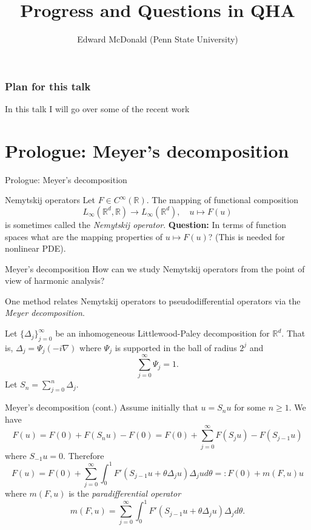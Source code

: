 \documentclass{beamer}
\newcommand\makebeamertitle{\frame{\maketitle}}%
\numberwithin{equation}{section}
\theoremstyle{plain}
\theoremstyle{plain}
\theoremstyle{definition}
\theoremstyle{plain}
\theoremstyle{plain}
\theoremstyle{definition}
\newcommand{\Rl}{\mathbb{R}}
\begin{document}
\title[Some recent progress and unanswered questions in Quantum Harmonic Analysis]{Progress and Questions in QHA}


\author[E. McDonald]{Edward McDonald (Penn State University)}



\makebeamertitle

\begin{frame}\frametitle{Plan for this talk}
    In this talk I will go over some of the recent work
\end{frame}

\section{Prologue: Meyer's decomposition}\label{meyer_section}

\begin{frame}
    \Huge{Prologue: Meyer's decomposition}
\end{frame}


\begin{frame}{Nemytskij operators}
    Let $F\in C^\infty(\Rl).$ The mapping of functional composition
    \[
        L_{\infty}(\Rl^d,\Rl)\to L_{\infty}(\Rl^d),\quad u\mapsto F(u)
    \]
    is sometimes called the \emph{Nemytskij operator}.
\pause
    \textbf{Question:} In terms of function spaces what are the mapping properties of $u\mapsto F(u)$? (This is needed for nonlinear PDE).
\end{frame}

\begin{frame}{Meyer's decomposition}
    How can we study Nemytskij operators from the point of view of harmonic analysis?\pause

    One method relates Nemytskij operators to pseudodifferential operators via the \emph{Meyer decomposition}.\pause

    Let $\{\Delta_j\}_{j=0}^\infty$ be an inhomogeneous Littlewood-Paley decomposition for $\Rl^d.$ That is, $\Delta_j = \Psi_j(-i\nabla)$ where $\Psi_j$
    is supported in the ball of radius $2^j$ and
    \[
        \sum_{j=0}^\infty \Psi_j = 1.
    \]
    Let $S_n = \sum_{j=0}^n\Delta_j.$
\end{frame}

\begin{frame}{Meyer's decomposition (cont.)}
    Assume initially that $u=S_nu$ for some $n\geq 1.$ We have
    \[
        F(u) = F(0)+F(S_nu)-F(0) = F(0)+\sum_{j=0}^\infty F(S_ju)-F(S_{j-1}u)
    \]
    where $S_{-1}u=0.$ Therefore
    \[
        F(u) = F(0)+\sum_{j=0}^\infty \int_0^1 F'(S_{j-1}u+\theta \Delta_j u)\Delta_j u d\theta =: F(0)+m(F,u)u
    \]
    where $m(F,u)$ is the \emph{paradifferential operator}
    \[
        m(F,u) = \sum_{j=0}^\infty \int_0^1 F'(S_{j-1}u+\theta \Delta_ju)\Delta_j d\theta.
    \]
\end{frame}
\end{document}
